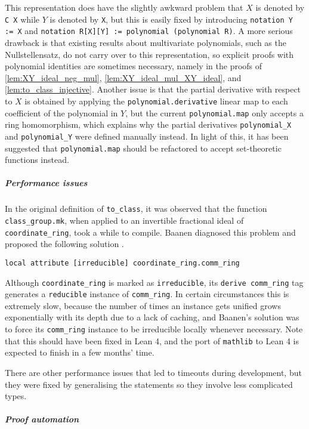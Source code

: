 \documentclass[a4paper,UKenglish,cleveref,autoref,thm-restate]{lipics-v2021}
\begin{document}
This representation does have the slightly awkward problem that $ X $ is denoted by \texttt{C X} while $ Y $ is denoted by \texttt{X}, but this is easily fixed by introducing \texttt{notation Y := X} and \texttt{notation R[X][Y] := polynomial (polynomial R)}. A more serious drawback is that existing results about multivariate polynomials, such as the Nullstellensatz, do not carry over to this representation, so explicit proofs with polynomial identities are sometimes necessary, namely in the proofs of \cref{lem:XY_ideal_neg_mul}, \cref{lem:XY_ideal_mul_XY_ideal}, and \cref{lem:to_class_injective}. Another issue is that the partial derivative with respect to $ X $ is obtained by applying the \texttt{polynomial.derivative} linear map to each coefficient of the polynomial in $ Y $, but the current \texttt{polynomial.map} only accepts a ring homomorphism, which explains why the partial derivatives \texttt{polynomial\_X} and \texttt{polynomial\_Y} were defined manually instead. In light of this, it has been suggested that \texttt{polynomial.map} should be refactored to accept set-theoretic functions instead.

\pagebreak

\subparagraph{Performance issues}

In the original definition of \texttt{to\_class}, it was observed that the function \texttt{class\_group.mk}, when applied to an invertible fractional ideal of \texttt{coordinate\_ring}, took a while to compile. Baanen diagnosed this problem and proposed the following solution \cite{angdinata}.
\begin{lstlisting}
local attribute [irreducible] coordinate_ring.comm_ring
\end{lstlisting}
Although \texttt{coordinate\_ring} is marked as \texttt{irreducible}, its \texttt{derive comm\_ring} tag generates a \texttt{reducible} instance of \texttt{comm\_ring}. In certain circumstances this is extremely slow, because the number of times an instance gets unified grows exponentially with its depth due to a lack of caching, and Baanen's solution was to force its \texttt{comm\_ring} instance to be irreducible locally whenever necessary. Note that this should have been fixed in Lean 4, and the port of \texttt{mathlib} to Lean 4 is expected to finish in a few months' time.

There are other performance issues that led to timeouts during development, but they were fixed by generalising the statements so they involve less complicated types.

\subparagraph{Proof automation}
\end{document}
